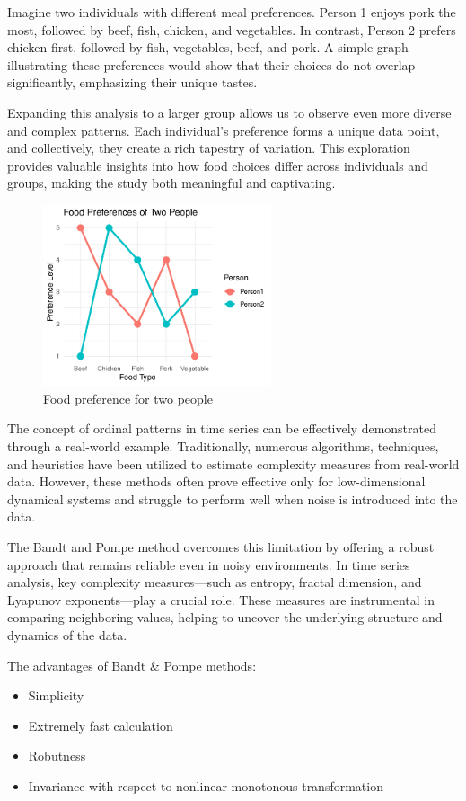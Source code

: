 Imagine two individuals with different meal preferences. Person 1 enjoys pork the most, followed by beef, fish, chicken, and vegetables. In contrast, Person 2 prefers chicken first, followed by fish, vegetables, beef, and pork. A simple graph illustrating these preferences would show that their choices do not overlap significantly, emphasizing their unique tastes.

Expanding this analysis to a larger group allows us to observe even more diverse and complex patterns. Each individual's preference forms a unique data point, and collectively, they create a rich tapestry of variation. This exploration provides valuable insights into how food choices differ across individuals and groups, making the study both meaningful and captivating.

\begin{figure}
	\centering
	\includegraphics[width=0.6\textwidth]{foodpreference}
	\caption{Food preference for two people}
\end{figure}

The concept of ordinal patterns in time series can be effectively demonstrated through a real-world example. Traditionally, numerous algorithms, techniques, and heuristics have been utilized to estimate complexity measures from real-world data. However, these methods often prove effective only for low-dimensional dynamical systems and struggle to perform well when noise is introduced into the data.

The Bandt and Pompe method overcomes this limitation by offering a robust approach that remains reliable even in noisy environments. In time series analysis, key complexity measures—such as entropy, fractal dimension, and Lyapunov exponents—play a crucial role. These measures are instrumental in comparing neighboring values, helping to uncover the underlying structure and dynamics of the data.

The advantages of Bandt \& Pompe methods:
\begin{itemize}
	\item Simplicity
	\item Extremely fast calculation
	\item Robutness
	\item Invariance with respect to nonlinear monotonous transformation
\end{itemize}	
	
